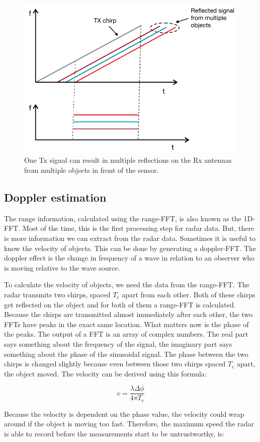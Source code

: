 \begin{figure}[t]
\centering
\includegraphics[width=.5\textwidth]{figures/background/reflected_signals.png}
\caption{One Tx signal can result in multiple reflections on the Rx antennas from multiple objects in front of the sensor.}
\label{fig:if_multiple}
\end{figure}

\subsection{Doppler estimation}
The range information, calculated using the range-FFT, is also known as the 1D-FFT. Most of the time, this is the first processing step for radar data. But, there is more information we can extract from the radar data. Sometimes it is useful to know the velocity of objects. This can be done by generating a doppler-FFT. The doppler effect is the change in frequency of a wave in relation to an observer who is moving relative to the wave source.

To calculate the velocity of objects, we need the data from the range-FFT. The radar transmits two chirps, spaced $T_c$ apart from each other. Both of these chirps get reflected on the object and for both of them a range-FFT is calculated. Because the chirps are transmitted almost immediately after each other, the two FFTs have peaks in the exact same location. What matters now is the phase of the peaks. The output of a FFT is an array of complex numbers. The real part says something about the frequency of the signal, the imaginary part says something about the phase of the sinusoidal signal. The phase between the two chirps is changed slightly because even between those two chirps spaced $T_c$ apart, the object moved. The velocity can be derived using this formula:

\begin{equation}
v = \frac{\lambda \Delta \phi}{4 \pi T_c}
\label{eq:doppler_equation}
\end{equation}

Because the velocity is dependent on the phase value, the velocity could wrap around if the object is moving too fast. Therefore, the maximum speed the radar is able to record before the measurements start to be untrustworthy, is:

